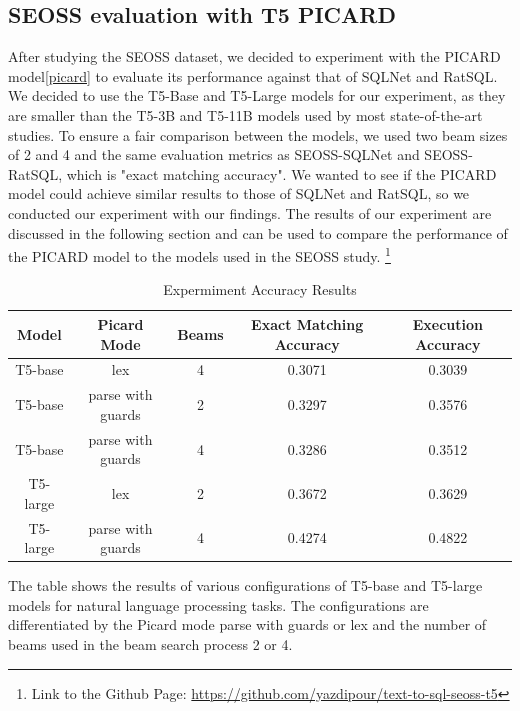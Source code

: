 \subsection{SEOSS evaluation with T5 PICARD}

After studying the SEOSS dataset, we decided to experiment with the PICARD model\ref{picard} to evaluate its performance against that of SQLNet and RatSQL. We decided to use the T5-Base and T5-Large models for our experiment, as they are smaller than the T5-3B and T5-11B models used by most state-of-the-art studies. To ensure a fair comparison between the models, we used two beam sizes of 2 and 4 and the same evaluation metrics as SEOSS-SQLNet and SEOSS-RatSQL, which is "exact matching accuracy". We wanted to see if the PICARD model could achieve similar results to those of SQLNet and RatSQL, so we conducted our experiment with our findings. The results of our experiment are discussed in the following section and can be used to compare the performance of the PICARD model to the models used in the SEOSS study.
\footnote[1]{Link to the Github Page: \url{https://github.com/yazdipour/text-to-sql-seoss-t5}}

\begin{table}[!ht]
    \centering
    \begin{tabular}{ccccc}
        \hline
        Model    & Picard Mode       & Beams & \textbf{Exact Matching Accuracy} & \textbf{Execution Accuracy} \\ \hline
        T5-base  & lex               & 4     & 0.3071                           & 0.3039                      \\ \hline
        T5-base  & parse with guards & 2     & 0.3297                           & 0.3576                      \\ \hline
        T5-base  & parse with guards & 4     & 0.3286                           & 0.3512                      \\ \hline
        T5-large & lex               & 2     & 0.3672                           & 0.3629                      \\ \hline
        T5-large & parse with guards & 4     & 0.4274                           & 0.4822                      \\ \hline
    \end{tabular}
    \caption{Expermiment Accuracy Results}
\end{table}

The table shows the results of various configurations of T5-base and T5-large models for natural language processing tasks. The configurations are differentiated by the Picard mode parse with guards or lex and the number of beams used in the beam search process 2 or 4.

